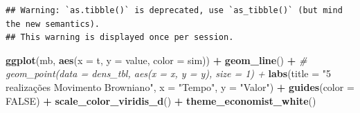 \documentclass[]{book}
\newenvironment{Shaded}{\begin{snugshade}}{\end{snugshade}}
\newcommand{\KeywordTok}[1]{\textcolor[rgb]{0.13,0.29,0.53}{\textbf{#1}}}
\newcommand{\DataTypeTok}[1]{\textcolor[rgb]{0.13,0.29,0.53}{#1}}
\newcommand{\DecValTok}[1]{\textcolor[rgb]{0.00,0.00,0.81}{#1}}
\newcommand{\StringTok}[1]{\textcolor[rgb]{0.31,0.60,0.02}{#1}}
\newcommand{\CommentTok}[1]{\textcolor[rgb]{0.56,0.35,0.01}{\textit{#1}}}
\newcommand{\OtherTok}[1]{\textcolor[rgb]{0.56,0.35,0.01}{#1}}
\newcommand{\ControlFlowTok}[1]{\textcolor[rgb]{0.13,0.29,0.53}{\textbf{#1}}}
\newcommand{\OperatorTok}[1]{\textcolor[rgb]{0.81,0.36,0.00}{\textbf{#1}}}
\newcommand{\NormalTok}[1]{#1}
\theoremstyle{definition}
\theoremstyle{definition}
\theoremstyle{definition}
\theoremstyle{remark}
\begin{document}
\begin{Shaded}
\end{Shaded}

\begin{verbatim}
## Warning: `as.tibble()` is deprecated, use `as_tibble()` (but mind the new semantics).
## This warning is displayed once per session.
\end{verbatim}

\begin{Shaded}
\begin{Highlighting}[]
\KeywordTok{ggplot}\NormalTok{(mb, }\KeywordTok{aes}\NormalTok{(}\DataTypeTok{x =}\NormalTok{ t, }\DataTypeTok{y =}\NormalTok{ value, }\DataTypeTok{color =}\NormalTok{ sim)) }\OperatorTok{+}\StringTok{ }
\StringTok{  }\KeywordTok{geom_line}\NormalTok{() }\OperatorTok{+}
\CommentTok{#  geom_point(data = dens_tbl, aes(x = x, y = y), size = 1) +}
\StringTok{  }\KeywordTok{labs}\NormalTok{(}\DataTypeTok{title =} \StringTok{"5 realizações Movimento Browniano"}\NormalTok{,}
       \DataTypeTok{x =} \StringTok{"Tempo"}\NormalTok{,}
       \DataTypeTok{y =} \StringTok{"Valor"}\NormalTok{) }\OperatorTok{+}
\StringTok{  }\KeywordTok{guides}\NormalTok{(}\DataTypeTok{color =} \OtherTok{FALSE}\NormalTok{) }\OperatorTok{+}
\StringTok{  }\KeywordTok{scale_color_viridis_d}\NormalTok{() }\OperatorTok{+}
\StringTok{  }\KeywordTok{theme_economist_white}\NormalTok{()}
\end{Highlighting}
\end{Shaded}
\end{document}
